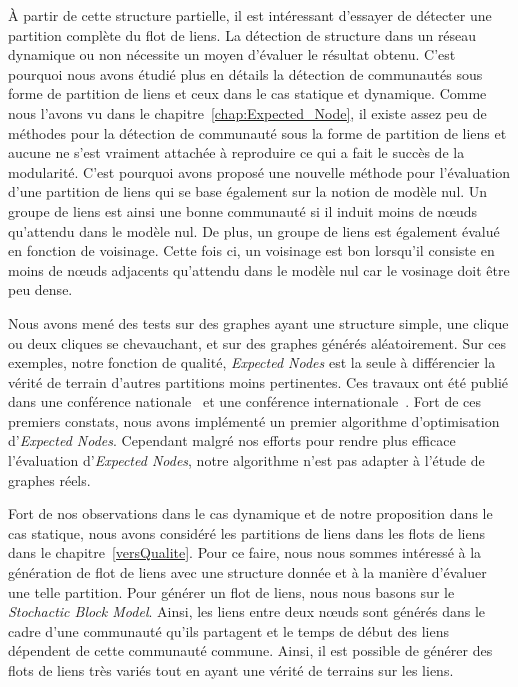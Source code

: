 \`A partir de cette structure partielle, il est intéressant d'essayer de détecter une partition complète du flot de liens.
La détection de structure dans un réseau dynamique ou non nécessite un moyen d'évaluer le résultat obtenu.
C'est pourquoi nous avons étudié plus en détails la détection de communautés sous forme de partition de liens et ceux dans le cas statique et dynamique.
Comme nous l'avons vu dans le chapitre~\ref{chap:Expected_Node}, il existe assez peu de méthodes pour la détection de communauté sous la forme de partition de liens et aucune ne s'est vraiment attachée à reproduire ce qui a fait le succès de la modularité.
C'est pourquoi avons proposé une nouvelle méthode pour l'évaluation d'une partition de liens qui se base également sur la notion de modèle nul.
Un groupe de liens est ainsi une bonne communauté si il induit moins de n\oe uds qu'attendu dans le modèle nul.
De plus, un groupe de liens est également évalué en fonction de voisinage.
Cette fois ci, un voisinage est bon lorsqu'il consiste en moins de n\oe uds adjacents qu'attendu dans le modèle nul car le vosinage doit être peu dense.

Nous avons mené des tests sur des graphes ayant une structure simple, une clique ou deux cliques se chevauchant, et sur des graphes générés aléatoirement.
Sur ces exemples, notre fonction de qualité, \emph{Expected Nodes} est la seule à différencier la vérité de terrain d'autres partitions moins pertinentes.
Ces travaux ont été publié dans une conférence nationale~\cite{Gaumont2014} et une conférence internationale~\cite{Gaumont2015}.
Fort de ces premiers constats, nous avons implémenté un premier algorithme d'optimisation d'\emph{Expected Nodes}.
Cependant malgré nos efforts pour rendre plus efficace l'évaluation d'\emph{Expected Nodes}, notre algorithme n'est pas adapter à l'étude de graphes réels.

\bigskip

Fort de nos observations dans le cas dynamique et de notre proposition dans le cas statique, nous avons considéré les partitions de liens dans les flots de liens dans le chapitre~\ref{versQualite}.
Pour ce faire, nous nous sommes intéressé à la génération de flot de liens avec une structure donnée et à la manière d'évaluer une telle partition.
Pour générer un flot de liens, nous nous basons sur le \emph{Stochactic Block Model}.
Ainsi, les liens entre deux n\oe uds sont générés dans le cadre d'une communauté qu'ils partagent et le temps de début des liens dépendent de cette communauté commune.
Ainsi, il est possible de générer des flots de liens très variés tout en ayant une vérité de terrains sur les liens.

